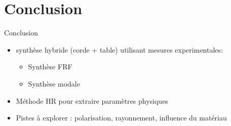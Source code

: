 \section*{Conclusion}
\begin{frame}{Conclusion}
  
\beamerdefaultoverlayspecification{} %

	\begin{itemize}
    \item synthèse hybride (corde + table) utilisant mesures experimentales:
        \begin{itemize}
          \item Synthèse FRF 
          \item Synthèse modale
        \end{itemize}
	  \item Méthode HR pour extraire paramètres physiques
	  \item Pistes à explorer : polarisation, rayonnement, influence du matériau
	\end{itemize}

\end{frame}
